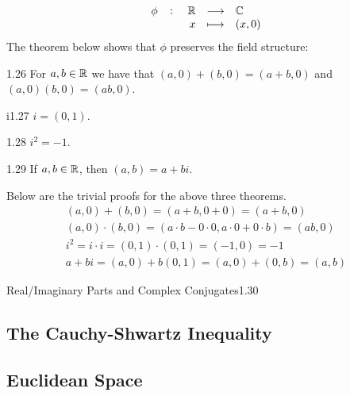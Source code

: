 \begin{align*}
    \fullfunction{\phi}{\RR}{\CC}{x}{(x, 0)}
\end{align*}
The theorem below shows that $\phi$ preserves the field structure:
\begin{theorem}{}{1.26}
    For $a, b \in \mathbb{R}$ we have that $(a, 0) + (b, 0) = (a + b, 0)$ and $(a, 0)(b, 0) = (ab, 0)$.
\end{theorem}
\begin{definition}{i}{1.27}
    $i = (0, 1)$. 
\end{definition}
\begin{theorem}{}{1.28}
    $i^2 = -1$. 
\end{theorem}
\begin{theorem}{}{1.29}
    If $a, b \in \mathbb{R}$, then $(a, b) = a + bi$. 
\end{theorem}
\begin{nproof}
    Below are the trivial proofs for the above three theorems. 
    \begin{align*}
        (a, 0) + (b, 0) = (a + b, 0 + 0) = (a + b, 0)
        \\ (a, 0)\cdot(b, 0) = (a\cdot b - 0 \cdot 0, a \cdot 0 + 0 \cdot b) = (ab, 0)
        \\ i^2 = i\cdot i = (0, 1) \cdot (0, 1) = (-1, 0) = -1
        \\ a + bi = (a, 0) + b(0, 1) = (a, 0) + (0, b) = (a, b)
    \end{align*}
\end{nproof}

\begin{definition}{Real/Imaginary Parts and Complex Conjugates}{1.30}

\end{definition}



\subsection{The Cauchy-Shwartz Inequality}

\subsection{Euclidean Space}


